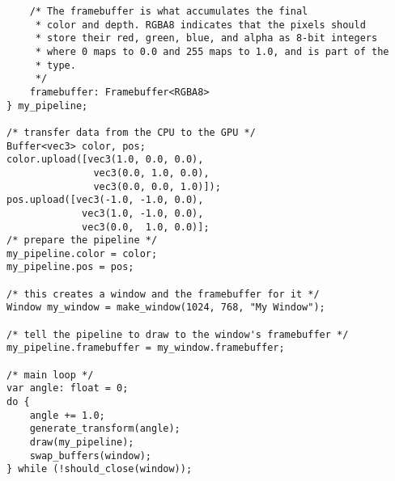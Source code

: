 \documentclass[11pt]{article}
\begin{document}
\begin{lstlisting}
    /* The framebuffer is what accumulates the final
     * color and depth. RGBA8 indicates that the pixels should
     * store their red, green, blue, and alpha as 8-bit integers
     * where 0 maps to 0.0 and 255 maps to 1.0, and is part of the
     * type.
     */
    framebuffer: Framebuffer<RGBA8>
} my_pipeline;

/* transfer data from the CPU to the GPU */
Buffer<vec3> color, pos;
color.upload([vec3(1.0, 0.0, 0.0),
			   vec3(0.0, 1.0, 0.0),
			   vec3(0.0, 0.0, 1.0)]);
pos.upload([vec3(-1.0, -1.0, 0.0),
			 vec3(1.0, -1.0, 0.0),
			 vec3(0.0,  1.0, 0.0)];
/* prepare the pipeline */
my_pipeline.color = color;
my_pipeline.pos = pos;

/* this creates a window and the framebuffer for it */
Window my_window = make_window(1024, 768, "My Window");

/* tell the pipeline to draw to the window's framebuffer */
my_pipeline.framebuffer = my_window.framebuffer;

/* main loop */
var angle: float = 0;
do {
    angle += 1.0;
    generate_transform(angle);
    draw(my_pipeline);
    swap_buffers(window);
} while (!should_close(window));

\end{lstlisting}
\end{document}
